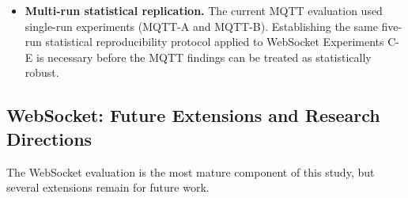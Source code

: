 \documentclass[twocolumn]{svjour3}
\begin{document}
\begin{itemize}[leftmargin=*]
  \item \textbf{Multi-run statistical replication.} The current MQTT evaluation used single-run experiments (MQTT-A and MQTT-B). Establishing the same five-run statistical reproducibility protocol applied to WebSocket Experiments C-E is necessary before the MQTT findings can be treated as statistically robust.
\end{itemize}

\subsection{WebSocket: Future Extensions and Research Directions}

The WebSocket evaluation is the most mature component of this study, but several extensions remain for future work.
\end{document}
